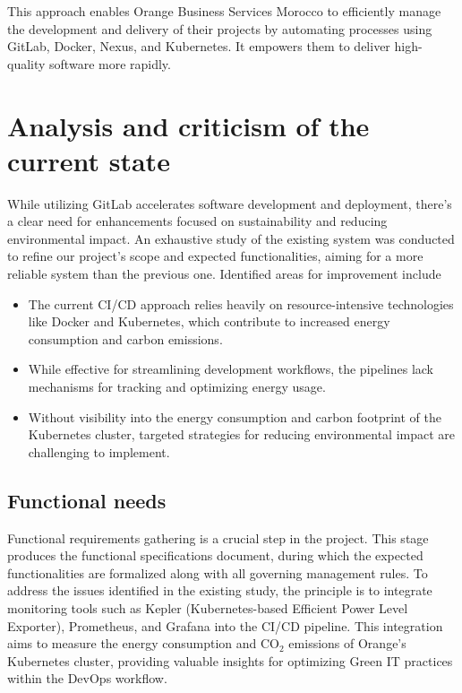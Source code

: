 This approach enables Orange Business Services Morocco to efficiently manage the development and delivery of their projects by automating processes using GitLab, Docker, Nexus, and Kubernetes. It empowers them to deliver high-quality software more rapidly.

\newpage
\section{Analysis and criticism of the current state}

While utilizing GitLab accelerates software development and deployment, there's a clear need for enhancements focused on sustainability and reducing environmental impact. An exhaustive study of the existing system was conducted to refine our project's scope and expected functionalities, aiming for a more reliable system than the previous one. Identified areas for improvement include

\begin{itemize}
  \item The current CI/CD approach relies heavily on resource-intensive technologies like Docker and Kubernetes, which contribute to increased energy consumption and carbon emissions.
  \item While effective for streamlining development workflows, the pipelines lack mechanisms for tracking and optimizing energy usage.
  \item Without visibility into the energy consumption and carbon footprint of the Kubernetes cluster, targeted strategies for reducing environmental impact are challenging to implement.
\end{itemize}

\subsection{Functional needs}
Functional requirements gathering is a crucial step in the project. This stage produces the functional specifications document, during which the expected functionalities are formalized along with all governing management rules. To address the issues identified in the existing study, the principle is to integrate monitoring tools such as Kepler (Kubernetes-based Efficient Power Level Exporter), Prometheus, and Grafana into the CI/CD pipeline. This integration aims to measure the energy consumption and CO$_2$ emissions of Orange's Kubernetes cluster, providing valuable insights for optimizing Green IT practices within the DevOps workflow.

